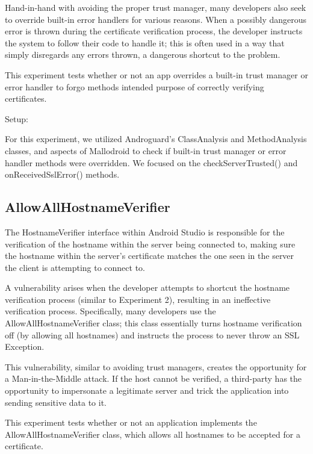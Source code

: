         Hand-in-hand with avoiding the proper trust manager, many developers also seek to override built-in error handlers for various reasons. When a possibly dangerous error is thrown during the certificate verification process, the developer instructs the system to follow their code to handle it; this is often used in a way that simply disregards any errors thrown, a dangerous shortcut to the problem.

        This experiment tests whether or not an app overrides a built-in
        trust manager or error handler to forgo methods intended purpose of
        correctly verifying certificates.

        Setup:

        For this experiment, we utilized Androguard's ClassAnalysis and 
        MethodAnalysis classes, and aspects of Mallodroid to
        check if built-in trust manager or error handler methods were overridden. 
        We focused on the checkServerTrusted() and onReceivedSslError() methods. 

    \subsection{AllowAllHostnameVerifier}
    
        The HostnameVerifier interface within Android Studio is responsible for the 
        verification of the hostname within the server being connected to, making 
        sure the hostname within the server's certificate matches the one 
        seen in the server the client is attempting to connect to. 

        A vulnerability arises when the developer attempts to shortcut the 
        hostname verification process (similar to Experiment 2), resulting 
        in an ineffective verification process. Specifically, many 
        developers use the AllowAllHostnameVerifier class; this class 
        essentially turns hostname verification off (by allowing all 
        hostnames) and instructs the process to never throw an SSL 
        Exception.

        This vulnerability, similar to avoiding trust managers, creates 
        the opportunity for a Man-in-the-Middle attack. If the host 
        cannot be verified, a third-party has the opportunity to impersonate
        a legitimate server and trick the application into sending 
        sensitive data to it.

        This experiment tests whether or not an application 
        implements the AllowAllHostnameVerifier class, which allows 
        all hostnames to be accepted for a certificate.

